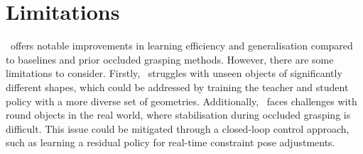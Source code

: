 \section{Limitations}


\ourmethod~offers notable improvements in learning efficiency and generalisation compared to baselines and prior occluded grasping methods. 
However, there are some limitations to consider.
Firstly, \ourmethod~struggles with unseen objects of significantly different shapes, which could be addressed by training the teacher and student policy with a more diverse set of geometries. 
Additionally, \ourmethod~faces challenges with round objects in the real world, where stabilisation during occluded grasping is difficult. 
This issue could be mitigated through a closed-loop control approach, such as learning a residual policy for real-time constraint pose adjustments.